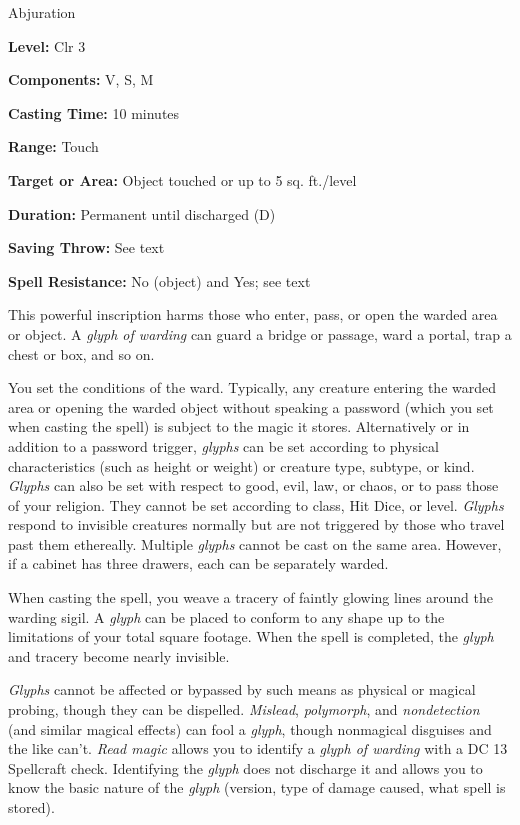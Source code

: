 \documentclass{article}
\begin{document}
Abjuration

\textbf{Level:} Clr 3

\textbf{Components:} V, S, M

\textbf{Casting Time:} 10 minutes

\textbf{Range:} Touch

\textbf{Target or Area:} Object touched or up to 5 sq. ft./level

\textbf{Duration:} Permanent until discharged (D)

\textbf{Saving Throw:} See text

\textbf{Spell Resistance:} No (object) and Yes; see text

This powerful inscription harms those who enter, pass, or open the warded area 
or object. A \textit{glyph of warding }can guard a bridge or passage, ward a portal, 
trap a chest or box, and so on.

You set the conditions of the ward. Typically, any creature entering the warded 
area or opening the warded object without speaking a password (which you set when 
casting the spell) is subject to the magic it stores. Alternatively or in addition 
to a password trigger, \textit{glyphs }can be set according to physical characteristics 
(such as height or weight) or creature type, subtype, or kind. \textit{Glyphs }can 
also be set with respect to good, evil, law, or chaos, or to pass those of your 
religion. They cannot be set according to class, Hit Dice, or level. \textit{Glyphs 
}respond to invisible creatures normally but are not triggered by those who travel 
past them ethereally. Multiple \textit{glyphs }cannot be cast on the same area. 
However, if a cabinet has three drawers, each can be separately warded.

When casting the spell, you weave a tracery of faintly glowing lines around the 
warding sigil. A \textit{glyph }can be placed to conform to any shape up to the 
limitations of your total square footage. When the spell is completed, the \textit{glyph 
}and tracery become nearly invisible.

\textit{Glyphs }cannot be affected or bypassed by such means as physical or magical 
probing, though they can be dispelled. \textit{Mislead}, \textit{polymorph}, and 
\textit{nondetection }(and similar magical effects) can fool a \textit{glyph}, 
though nonmagical disguises and the like can't. \textit{Read magic }allows you 
to identify a \textit{glyph of warding }with a DC 13 Spellcraft check. Identifying 
the \textit{glyph }does not discharge it and allows you to know the basic nature 
of the \textit{glyph }(version, type of damage caused, what spell is stored).
\end{document}
